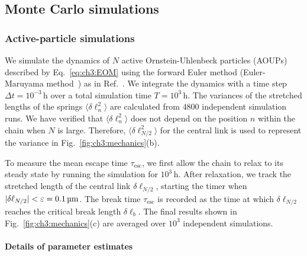 \subsection{Monte Carlo simulations}
\label{sec:ch3:mc}

\subsubsection{Active-particle simulations}
\label{sec:ch3:AOUP_simulation}

We simulate the dynamics of $N$ active Ornstein-Uhlenbeck particles (AOUPs) described by Eq.~\eqref{eq:ch3:EOM} using the forward Euler method (Euler-Maruyama method~\cite{kloeden1992stochastic}) as in Ref.~\cite{fodor2016far}. We integrate the dynamics with a time step $\Delta t=10^{-3}\,\mathrm{h}$ over a total simulation time $T=10^3\,\mathrm{h}$. The variances of the stretched lengths of the springs $\langle\delta\ell_n^2\rangle$ are calculated from $4800$ independent simulation runs. We have verified that $\langle \delta\ell_n^2\rangle$ does not depend on the position $n$ within the chain when $N$ is large. Therefore, $\langle\delta\ell_{N/2}^2\rangle$ for the central link is used to represent the variance in Fig.~\ref{fig:ch3:mechanics}(b).

To measure the mean escape time $\tau_\mathrm{esc}$, we first allow the chain to relax to its steady state by running the simulation for $10^3\,\mathrm{h}$. After relaxation, we track the stretched length of the central link $\delta\ell_{N/2}$, starting the timer when $|\delta\ell_{N/2}|<\varepsilon=0.1\,\textrm{\textmu}\mathrm{m}$. The break time $\tau_\mathrm{esc}$ is recorded as the time at which $\delta\ell_{N/2}$ reaches the critical break length $\delta\ell_b$. The final results shown in Fig.~\ref{fig:ch3:mechanics}(c) are averaged over $10^3$ independent simulations.


\paragraph{Details of parameter estimates}
\label{sec:ch3:AOUP_params}

